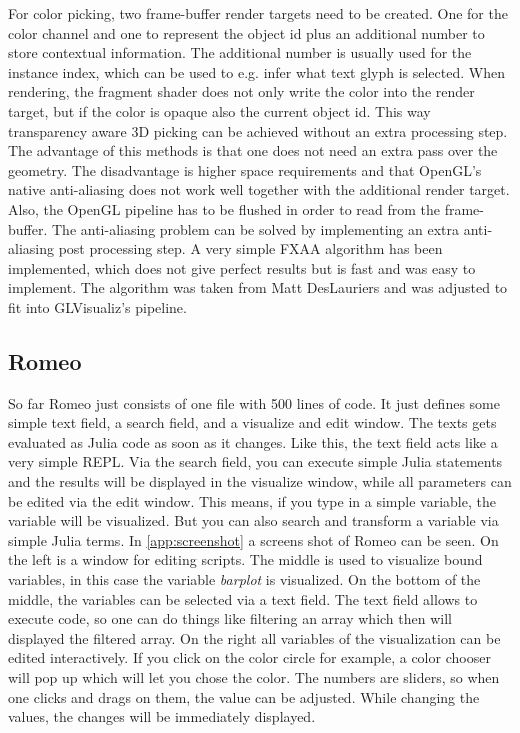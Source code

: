 For color picking, two frame-buffer render targets need to be created. 
One for the color channel and one to represent the object id plus an additional number to store contextual information. The additional number is usually used for the instance index, which can be used to e.g. infer what text glyph is selected.
When rendering, the fragment shader does not only write the color into the render target, but if the color is opaque also the current object id.
This way transparency aware 3D picking can be achieved without an extra processing step. 
The advantage of this methods is that one does not need an extra pass over the geometry. The disadvantage is higher space requirements and that OpenGL's native anti-aliasing does not work well together with the additional render target. Also, the OpenGL pipeline has to be flushed in order to read from the frame-buffer.
The anti-aliasing problem can be solved by implementing an extra anti-aliasing post processing step. A very simple FXAA algorithm has been implemented, which does not give perfect results but is fast and was easy to implement. The algorithm was taken from Matt DesLauriers\cite{FXAA} and was adjusted to fit into GLVisualiz's pipeline.


\subsection{Romeo}

So far Romeo just consists of one file with 500 lines of code. It just defines some simple text field, a search field, and a visualize and edit window.
The texts gets evaluated as Julia code as soon as it changes. Like this, the text field acts like a very simple \ac{REPL}.
Via the search field, you can execute simple Julia statements and the results will be displayed in the visualize window, while all parameters can be edited via the edit window.
This means, if you type in a simple variable, the variable will be visualized. But you can also search and transform a variable via simple Julia terms.
In \ref{app:screenshot} a screens shot of Romeo can be seen.
On the left is a window for editing scripts. The middle is used to visualize bound variables, in this case the variable \textit{barplot} is visualized.
On the bottom of the middle, the variables can be selected via a text field. The text field allows to execute code, so one can do things like filtering an array which then will displayed the filtered array.
On the right all variables of the visualization can be edited interactively.
If you click on the color circle for example, a color chooser will pop up which will let you chose the color.
The numbers are sliders, so when one clicks and drags on them, the value can be adjusted. 
While changing the values, the changes will be immediately displayed.
